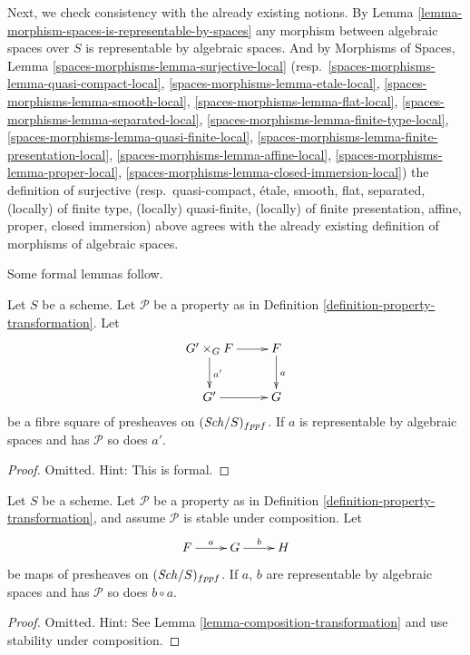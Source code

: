 \medskip\noindent
Next, we check consistency with the already existing notions. By
Lemma \ref{lemma-morphism-spaces-is-representable-by-spaces}
any morphism between algebraic spaces over $S$ is representable by
algebraic spaces. And by
Morphisms of Spaces,
Lemma \ref{spaces-morphisms-lemma-surjective-local}
(resp.\ \ref{spaces-morphisms-lemma-quasi-compact-local},
\ref{spaces-morphisms-lemma-etale-local},
\ref{spaces-morphisms-lemma-smooth-local},
\ref{spaces-morphisms-lemma-flat-local},
\ref{spaces-morphisms-lemma-separated-local},
\ref{spaces-morphisms-lemma-finite-type-local},
\ref{spaces-morphisms-lemma-quasi-finite-local},
\ref{spaces-morphisms-lemma-finite-presentation-local},
\ref{spaces-morphisms-lemma-affine-local},
\ref{spaces-morphisms-lemma-proper-local},
\ref{spaces-morphisms-lemma-closed-immersion-local})
the definition of
surjective
(resp.\ quasi-compact,
\'etale,
smooth,
flat,
separated,
(locally) of finite type,
(locally) quasi-finite,
(locally) of finite presentation,
affine,
proper,
closed immersion)
above agrees with the already existing definition of morphisms
of algebraic spaces.

\medskip\noindent
Some formal lemmas follow.

\begin{lemma}
\label{lemma-base-change-transformation-property}
Let $S$ be a scheme.
Let $\mathcal{P}$ be a property as in
Definition \ref{definition-property-transformation}.
Let
$$
\xymatrix{
G' \times_G F \ar[r] \ar[d]^{a'} & F \ar[d]^a \\
G' \ar[r] & G
}
$$
be a fibre square of presheaves on $(\mathit{Sch}/S)_{fppf}$.
If $a$ is representable by algebraic spaces and has $\mathcal{P}$
so does $a'$.
\end{lemma}

\begin{proof}
Omitted. Hint: This is formal.
\end{proof}

\begin{lemma}
\label{lemma-composition-transformation-property}
Let $S$ be a scheme.
Let $\mathcal{P}$ be a property as in
Definition \ref{definition-property-transformation},
and assume $\mathcal{P}$ is stable under composition.
Let
$$
\xymatrix{
F \ar[r]^a & G \ar[r]^b & H
}
$$
be maps of presheaves on $(\mathit{Sch}/S)_{fppf}$.
If $a$, $b$ are representable by algebraic spaces and has
$\mathcal{P}$ so does $b \circ a$.
\end{lemma}

\begin{proof}
Omitted. Hint: See
Lemma \ref{lemma-composition-transformation}
and use stability under composition.
\end{proof}

